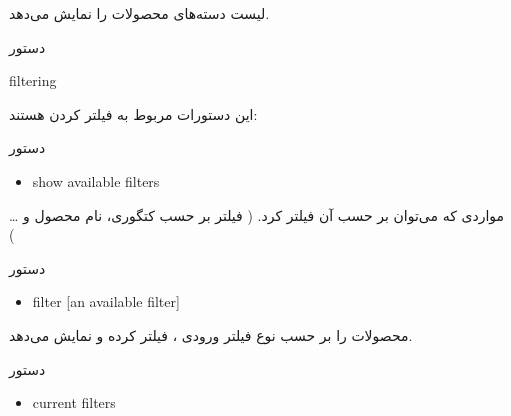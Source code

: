 \documentclass[]{article}
\begin{document}
لیست دسته‌های محصولات را نمایش می‌دهد.

\hrulefill


\begin{mybox}[colback=yellow]{دستور}

\begin{latin}

filtering

\end{latin}

\end{mybox}

این دستورات مربوط به فیلتر کردن هستند:


\begin{mybox}[colback=brilliantlavender]{دستور}

\begin{latin}

\begin{itemize}[label = {$\Rightarrow$}]

\item
show available filters

\end{itemize}

\end{latin}

\end{mybox}

مواردی که می‌توان بر حسب آن فیلتر کرد. ( فیلتر بر حسب کتگوری، نام محصول و … )



\begin{mybox}[colback=brilliantlavender]{دستور}

\begin{latin}

\begin{itemize}[label = {$\Rightarrow$}]

\item
filter [an available filter]

\end{itemize}

\end{latin}

\end{mybox}

محصولات را بر حسب نوع فیلتر ورودی ، فیلتر کرده و نمایش می‌دهد.



\begin{mybox}[colback=brilliantlavender]{دستور}

\begin{latin}

\begin{itemize}[label = {$\Rightarrow$}]

\item
current filters

\end{itemize}

\end{latin}

\end{mybox}
\end{document}
